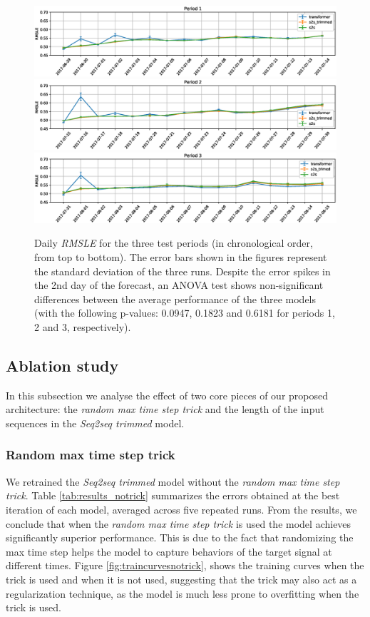 \documentclass{elsarticle}
\begin{document}
\begin{figure}
	\centering
	\includegraphics[width=1\linewidth]{img/lag3_daily_error}
	\includegraphics[width=1\linewidth]{img/lag2_daily_error}
	\includegraphics[width=1\linewidth]{img/lag1_daily_error}
	\caption{Daily \textit{RMSLE} for the three test periods (in chronological order, from top to bottom). The error bars shown in the figures represent the standard deviation of the three runs. Despite the error spikes in the 2nd day of the forecast, an ANOVA test shows non-significant differences between the average performance of the three models (with the following p-values: 0.0947, 0.1823 and 0.6181 for periods 1, 2 and 3, respectively). }
	\label{fig:dailyerror}
\end{figure}


	\subsection{Ablation study}
	In this subsection we analyse the effect of two core pieces of our proposed architecture: the \textit{random max time step trick} and the length of the  input sequences in the \textit{Seq2seq trimmed} model.
	
	\subsubsection{Random max time step trick}
	We retrained the \textit{Seq2seq trimmed} model without the \textit{random max time step trick}. Table \ref{tab:results_notrick} summarizes the errors obtained at the best iteration of each model, averaged across five repeated runs. From the results, we conclude that when the \textit{random max time step trick} is used the model achieves significantly superior performance. This is due to the fact that randomizing the max time step helps the model to capture behaviors of the target signal at different times. Figure \ref{fig:traincurvesnotrick}, shows the training curves when the trick is used and when it is not used, suggesting that the trick may also act as a regularization technique, as the model is much less prone to overfitting when the trick is used. 
	
\end{document}
